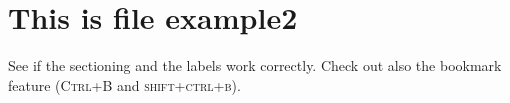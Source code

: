 \section{This is file example2}
See if the sectioning and the labels work correctly. Check out also the bookmark feature (\textsc{Ctrl+B} and \textsc{shift+ctrl+b}).\label{in-example2}